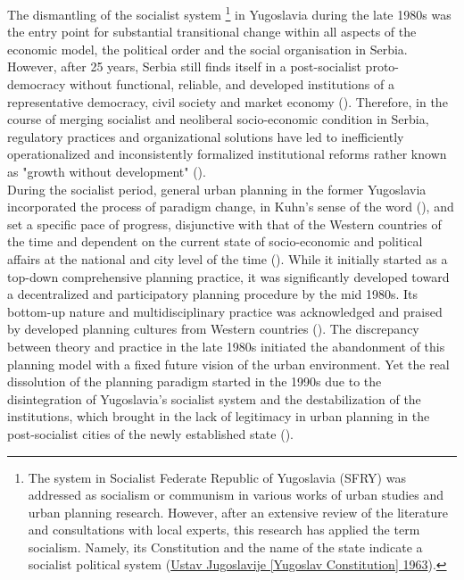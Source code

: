 \documentclass[11pt]{report}
\begin{document}
{{{{The  dismantling  of  the  socialist system
\footnote{The system in Socialist Federate Republic of Yugoslavia (SFRY) was addressed as socialism or communism in various works of urban studies and urban planning research. However, after an extensive review of the literature and consultations with local experts, this research has applied the term socialism. Namely, its Constitution and the name of the state indicate a socialist political system  (\href{Ustav}{Ustav Jugoslavije [Yugoslav Constitution] 1963}).}
in Yugoslavia during the late 1980s was the entry point for substantial transitional change within all aspects of the economic model, the political order and the social organisation in Serbia. 
However, after 25 years, Serbia still finds itself in a post-socialist proto-democracy without functional, reliable, and developed institutions of a representative 
democracy, civil society and market economy (\href{Vujosevic}{\citealt{vujosevic_postsocijalisticka_2010}}). 
Therefore, in the course of merging socialist and neoliberal socio-economic condition in Serbia, regulatory practices and organizational solutions have led to inefficiently operationalized and inconsistently formalized institutional reforms rather known as "growth without development" (\href{ref}{\citealt{vujosevic_collapse_2010}}).
\\

During the socialist period, general urban planning in the former Yugoslavia incorporated the process of paradigm change, in Kuhn’s sense of the word (\citealt{kuhn_structure_1962}), and set a specific pace of progress, disjunctive with that of the Western countries of the time and dependent on the current state of socio-economic and political affairs at the national and city level of the time (\href{Bajic}{\citealt{bajic-brkovic_city_2002}}).
While it initially started as a top-down comprehensive planning practice, it was significantly developed toward a decentralized and participatory planning procedure by the mid 1980s. Its bottom-up nature and multidisciplinary practice was acknowledged and praised by developed planning cultures from Western countries (\href{Cullingworth}{\citealt{cullingworth_planning_1997}}).
The discrepancy between theory and practice in the late 1980s initiated the abandonment of this planning model with a fixed future vision of the urban environment. Yet the real dissolution of the planning paradigm started in the 1990s due to the disintegration of Yugoslavia’s socialist system and the destabilization of the institutions, which brought in the lack of legitimacy in urban planning in the post-socialist cities of the newly established state  (\href{Vujosevic}{\citealt{vujosevic_post-socialist_2010}}).
\\

}}}}
\end{document}
